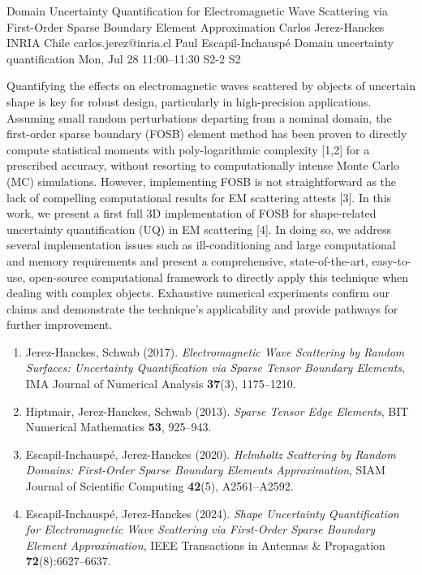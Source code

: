 \begin{talk}
  {Domain Uncertainty Quantification for Electromagnetic Wave Scattering via First-Order Sparse Boundary Element Approximation}%
  {Carlos Jerez-Hanckes}%
  {INRIA Chile}%
  {carlos.jerez@inria.cl}%
  {Paul Escapil-Inchausp\'e}%
  {Domain uncertainty quantification}%
  {Mon, Jul 28 11:00--11:30}%
  {S2-2}%
  {S2}%
    
   
Quantifying the effects on electromagnetic waves scattered by objects of uncertain shape is key for robust design, particularly in high-precision applications. Assuming small random perturbations departing from a nominal domain, the first-order sparse boundary (FOSB) element method has been proven to directly compute statistical moments with poly-logarithmic complexity [1,2] for a prescribed accuracy, without resorting to computationally intense Monte Carlo (MC) simulations. However, implementing FOSB is not straightforward as the lack of compelling computational results for EM scattering attests [3]. In this work, we present a first full 3D implementation of FOSB for shape-related uncertainty quantification (UQ) in EM scattering [4]. In doing so, we address several implementation issues such as ill-conditioning and large computational and memory requirements and present a comprehensive, state-of-the-art, easy-to-use, open-source computational framework to directly apply this technique when dealing with complex objects. Exhaustive numerical experiments confirm our claims and demonstrate the technique's applicability and provide pathways for further improvement.

\medskip

\begin{enumerate}
 \item[{[1]}] Jerez-Hanckes, Schwab (2017). {\it Electromagnetic Wave Scattering by Random Surfaces: Uncertainty Quantification via Sparse Tensor Boundary Elements}, IMA Journal of Numerical Analysis {\bf 37}(3), 1175--1210.
 \item[{[2]}] Hiptmair, Jerez-Hanckes, Schwab (2013). {\it Sparse Tensor Edge Elements}, BIT Numerical Mathematics {\bf 53}, 925--943.
 \item[{[3]}] Escapil-Inchausp\'e, Jerez-Hanckes (2020). {\it Helmholtz Scattering by Random Domains: First-Order Sparse Boundary Elements Approximation}, SIAM Journal of Scientific Computing {\bf 42}(5), A2561--A2592.
 \item[{[4]}] Escapil-Inchausp\'e, Jerez-Hanckes (2024). {\it Shape Uncertainty Quantification for Electromagnetic Wave Scattering via First-Order Sparse Boundary Element Approximation}, IEEE Transactions in Antennas \& Propagation {\bf 72}(8):6627--6637.
\end{enumerate}


\end{talk}
